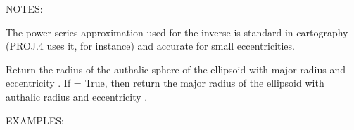 \documentclass[a4paper,12ptopenany,oneside,english]{sphinxmanual}
\begin{document}
\begin{fulllineitems}
\begin{description}
\end{description}

\sphinxAtStartPar
NOTES:

\sphinxAtStartPar
The power series approximation used for the inverse is
standard in cartography (PROJ.4 uses it, for instance)
and accurate for small eccentricities.

\end{fulllineitems}


\begin{fulllineitems}
\label{\detokenize{utils:rhealpixdggs.utils.auth_rad}}
\pysigstartsignatures
{}
\pysigstopsignatures
\sphinxAtStartPar
Return the radius of the authalic sphere of the ellipsoid with major
radius  and eccentricity .
If  = True, then return the major radius of the ellipsoid
with authalic radius  and eccentricity .

\sphinxAtStartPar
EXAMPLES:


\end{fulllineitems}
\end{document}
